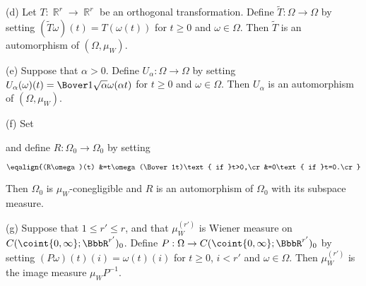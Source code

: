 (d) Let $T:\BbbR^r\to\BbbR^r$ be an orthogonal
transformation.   Define $\tilde T:\Omega\to\Omega$ by setting
$(\tilde T\omega)(t)=T(\omega(t))$ for $t\ge 0$ and $\omega\in\Omega$.
Then $\tilde T$ is an automorphism of $(\Omega,\mu_W)$.

(e) Suppose that $\alpha>0$.   Define $U_{\alpha}:\Omega\to\Omega$ by
setting $U_{\alpha}(\omega)(t)=\Bover1{\sqrt{\alpha}}\omega(\alpha t)$ for
$t\ge 0$ and $\omega\in\Omega$.   Then $U_{\alpha}$ is an automorphism of
$(\Omega,\mu_W)$.

(f) Set


\noindent and define $R:\Omega_0\to\Omega_0$ by setting

$$\eqalign{(R\omega)(t)
&=t\omega(\Bover1t)\text{ if }t>0,\cr
&=0\text{ if }t=0.\cr}$$

\noindent Then $\Omega_0$ is $\mu_W$-conegligible and $R$ is an
automorphism of $\Omega_0$ with its subspace measure.

(g) Suppose that $1\le r'\le r$, and that $\mu_W^{(r')}$ is Wiener measure
on $C(\coint{0,\infty};\BbbR^{r'})_0$.   Define
$P:\Omega\to C(\coint{0,\infty};\BbbR^{r'})_0$ by setting
$(P\omega)(t)(i)=\omega(t)(i)$ for $t\ge 0$, $i<r'$ and $\omega\in\Omega$.
Then $\mu_W^{(r')}$ is the image measure $\mu_WP^{-1}$.

